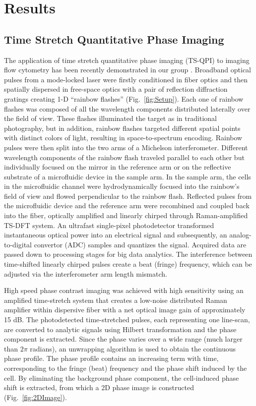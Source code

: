 \documentclass[aps,pra,reprint,superscriptaddress]{revtex4-1}
\begin{document}
\section{Results}
\subsection{Time Stretch Quantitative Phase Imaging}

The application of time stretch quantitative phase imaging (TS-QPI) to imaging flow cytometry has been recently demonstrated in our group \cite{mahjoubfar2013label}. Broadband optical pulses from a mode-locked laser were firstly conditioned in fiber optics and then spatially dispersed in free-space optics with a pair of reflection diffraction gratings creating 1-D ``rainbow flashes'' (Fig.~\ref{fig:Setup}). Each one of rainbow flashes was composed of all the wavelength components distributed laterally over the field of view. These flashes illuminated the target as in traditional photography, but in addition, rainbow flashes targeted different spatial points with distinct colors of light, resulting in space-to-spectrum encoding. Rainbow pulses were then split into the two arms of a Michelson interferometer. Different wavelength components of the rainbow flash traveled parallel to each other but individually focused on the mirror in the reference arm or on the reflective substrate of a microfluidic device in the sample arm. In the sample arm, the cells in the microfluidic channel were hydrodynamically focused \cite{knight1998hydrodynamic,lee2006hydrodynamic} into the rainbow's field of view and flowed perpendicular to the rainbow flash. Reflected pulses from the microfluidic device and the reference arm were recombined and coupled back into the fiber, optically amplified and linearly chirped through Raman-amplified TS-DFT system. An ultrafast single-pixel photodetector  transformed instantaneous optical power into an electrical signal and subsequently, an analog-to-digital convertor (ADC) samples and quantizes the signal. Acquired data are passed down to processing stages for big data analytics. The interference between time-shifted linearly chirped pulses create a beat (fringe) frequency, which can be adjusted via the interferometer arm length mismatch.

High speed phase contrast imaging was achieved with high sensitivity using an amplified time-stretch system that creates a low-noise distributed Raman amplifier within dispersive fiber with a net optical image gain of approximately 15 dB. The photodetected time-stretched pulses, each representing one line-scan, are converted to analytic signals using Hilbert transformation \cite{king2009hilbert} and the phase component is extracted. Since the phase varies over a wide range (much larger than $2 \pi$ radians), an unwrapping algorithm is used to obtain the continuous phase profile. The phase profile contains an increasing term with time, corresponding to the fringe (beat) frequency and the phase shift induced by the cell. By eliminating the background phase component, the cell-induced phase shift is extracted, from which a 2D phase image is constructed (Fig.~\ref{fig:2DImage}).
\end{document}
